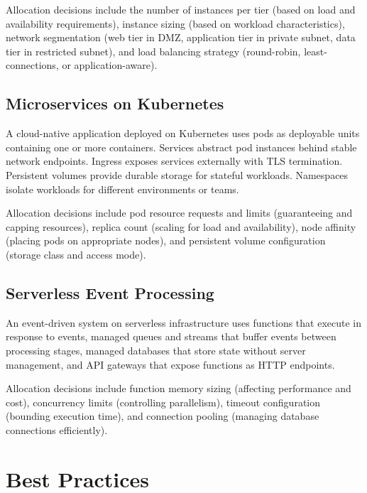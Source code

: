 \documentclass[11pt]{article}
\begin{document}
Allocation decisions include the number of instances per tier (based on load and availability requirements), instance sizing (based on workload characteristics), network segmentation (web tier in DMZ, application tier in private subnet, data tier in restricted subnet), and load balancing strategy (round-robin, least-connections, or application-aware).

\subsection{Microservices on Kubernetes}

A cloud-native application deployed on Kubernetes uses pods as deployable units containing one or more containers. Services abstract pod instances behind stable network endpoints. Ingress exposes services externally with TLS termination. Persistent volumes provide durable storage for stateful workloads. Namespaces isolate workloads for different environments or teams.

Allocation decisions include pod resource requests and limits (guaranteeing and capping resources), replica count (scaling for load and availability), node affinity (placing pods on appropriate nodes), and persistent volume configuration (storage class and access mode).

\subsection{Serverless Event Processing}

An event-driven system on serverless infrastructure uses functions that execute in response to events, managed queues and streams that buffer events between processing stages, managed databases that store state without server management, and API gateways that expose functions as HTTP endpoints.

Allocation decisions include function memory sizing (affecting performance and cost), concurrency limits (controlling parallelism), timeout configuration (bounding execution time), and connection pooling (managing database connections efficiently).

\section{Best Practices}
\end{document}
